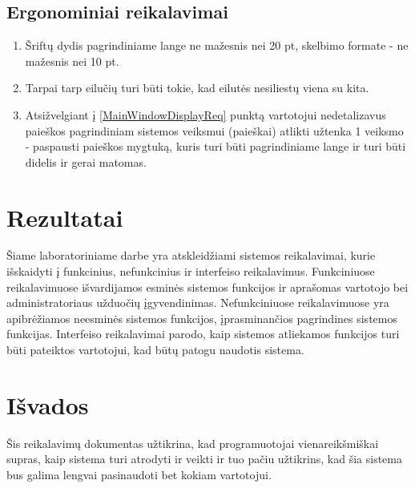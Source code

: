 \documentclass[12pt]{article}
\begin{document}
	\subsection{Ergonominiai reikalavimai}
	\begin{enumerate}[labelindent=10pt,leftmargin=2.2cm]
		\item Šriftų dydis pagrindiniame lange ne mažesnis nei 20 pt, skelbimo formate - ne mažesnis nei 10 pt.
		\item Tarpai tarp eilučių turi būti tokie, kad eilutės nesiliestų viena su kita.
		\item Atsižvelgiant į \ref{MainWindowDisplayReq} punktą vartotojui nedetalizavus paieškos pagrindiniam sistemos veiksmui (paieškai) atlikti užtenka 1 veiksmo - paspausti paieškos mygtuką, kuris turi būti pagrindiniame lange ir turi būti didelis ir gerai matomas.
	\end{enumerate}
	\pagebreak
	
	\section*{Rezultatai}	
	Šiame laboratoriniame darbe yra atskleidžiami sistemos reikalavimai, kurie išskaidyti į funkcinius, nefunkcinius ir interfeiso reikalavimus. Funkciniuose reikalavimuose išvardijamos esminės sistemos funkcijos ir aprašomas vartotojo bei administratoriaus užduočių įgyvendinimas. Nefunkciniuose reikalavimuose yra apibrėžiamos neesminės sistemos funkcijos, įprasminančios pagrindines sistemos funkcijas. Interfeiso reikalavimai parodo, kaip sistemos atliekamos funkcijos turi būti pateiktos vartotojui, kad būtų patogu naudotis sistema.
	\pagebreak
	
	\section*{Išvados}	
	Šis reikalavimų dokumentas užtikrina, kad programuotojai vienareikšmiškai supras, kaip sistema turi atrodyti ir veikti ir tuo pačiu užtikrins, kad šia sistema bus galima lengvai pasinaudoti bet kokiam vartotojui.
\end{document}
